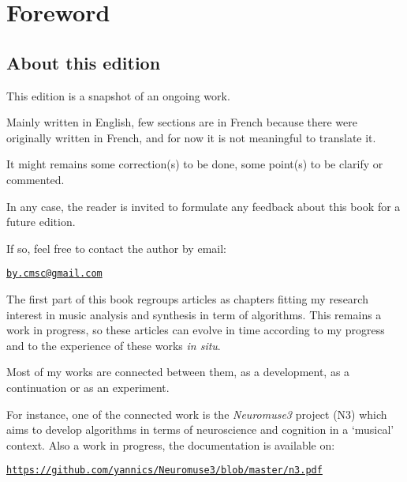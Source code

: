 \frontmatter
\def\thepage{\arabic{page}}
\setcounter{page}{3}

\chapter*{Foreword}
\thispagestyle{empty}

\section*{About this edition}
\label{ate}

This edition is a snapshot of an ongoing work. 
\smallskip

Mainly written in English, few sections are in French because there were originally written in French, and for now it is not meaningful to translate it. 

\smallskip

It might remains some correction(s) to be done, some point(s) to be clarify or commented. 

In any case, the reader is invited to formulate any feedback about this book for a future edition.

\smallskip

If so, feel free to contact the author by email: 

\smallskip

\quad \quad \href{mailto:jby.cmsc@gmail.com}{\texttt{by.cmsc@gmail.com}}

\bigskip

The first part of this book regroups articles as chapters fitting my research interest in music analysis and synthesis in term of algorithms. This remains a work in progress, so these articles can evolve in time according to my progress and to the experience of these works \textit{in situ}. 

\smallskip

Most of my works are connected between them, as a development, as a continuation or as an experiment.

\smallskip
For instance, one of the connected work is the \textsl{Neuromuse3} project (N3) which aims to develop algorithms in terms of neuroscience and cognition in a `musical' context. Also a work in progress, the documentation is available on:

\href{https://github.com/yannics/Neuromuse3/blob/master/n3.pdf}{\texttt{\small https://github.com/yannics/Neuromuse3/blob/master/n3.pdf}}

